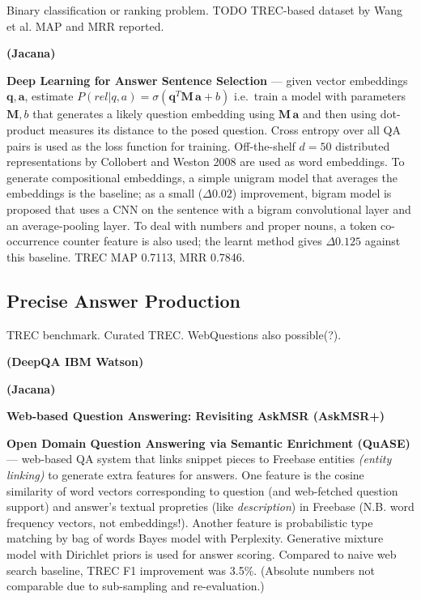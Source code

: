 \documentclass[11pt,a4paper]{article}
\begin{document}
Binary classification or ranking problem.
TODO TREC-based dataset by Wang et al.
MAP and MRR reported.

\textbf{(Jacana)} \cite{TreeEdit2013Yao}

\textbf{Deep Learning for Answer Sentence Selection} \cite{Yu2014Deep}
	--- given vector embeddings $\mathbf{q}, \mathbf{a}$, estimate
	$P(rel|q,a) = \sigma(\mathbf{q}^T \mathbf{M}\, \mathbf{a} + b)$
	i.e.\ train a model with parameters $\mathbf{M}, b$ that
	generates a likely question embedding using $\mathbf{M}\, \mathbf{a}$
	and then using dot-product measures its distance to the posed question.
	Cross entropy over all QA pairs is used as the loss function for training.
	Off-the-shelf $d=50$ distributed representations by Collobert and Weston 2008
	are used as word embeddings.
	To generate compositional embeddings,
	a simple unigram model that averages the embeddings is the baseline;
	as a small ($\Delta 0.02$) improvement, bigram model is proposed that uses a CNN
	on the sentence with a bigram convolutional layer and an average-pooling layer.
	To deal with numbers and proper nouns, a token co-occurrence counter
	feature is also used; the learnt method gives $\Delta 0.125$ against this baseline.
	TREC MAP 0.7113, MRR 0.7846.

\subsection{Precise Answer Production}

TREC benchmark.  Curated TREC.  WebQuestions also possible(?).

\textbf{(DeepQA IBM Watson)} \cite{WatsonOverview}

\textbf{(Jacana)} \cite{TreeEdit2013Yao} \cite{TreeEditIR2013Yao}

\textbf{Web-based Question Answering: Revisiting AskMSR (AskMSR+)}

\textbf{Open Domain Question Answering via Semantic Enrichment (QuASE)} \cite{QuASE}
	--- web-based QA system that links snippet pieces to Freebase entities
	\textit{(entity linking)} to generate extra features for answers.
	One feature is the cosine similarity of word
	vectors corresponding to question (and web-fetched question support)
	and answer's textual propreties (like \textit{description}) in Freebase
	(N.B. word frequency vectors, not embeddings!).
	Another feature is probabilistic type matching by bag of words Bayes model
	with Perplexity.  Generative mixture model with Dirichlet priors is used
	for answer scoring.  Compared to naive web search baseline, TREC F1
	improvement was 3.5\%.  (Absolute numbers not comparable due to
	sub-sampling and re-evaluation.)
\end{document}
